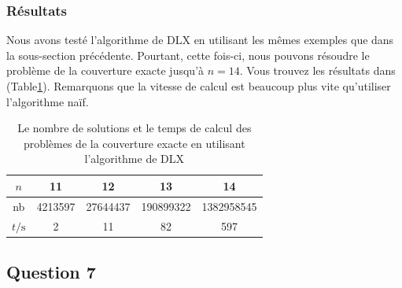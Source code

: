 \documentclass[a4paper,12pt]{article}
\begin{document}
\subsubsection{Résultats}
Nous avons testé l'algorithme de DLX en utilisant les mêmes exemples que dans la sous-section précédente. Pourtant, cette fois-ci, nous pouvons résoudre le problème de la couverture exacte jusqu'à $n=14$. Vous trouvez les résultats dans (Table\ref{tab:nbsolution_dlx}). Remarquons que la vitesse de calcul est beaucoup plus vite qu'utiliser l'algorithme naïf.
\begin{table}[h]
	\caption{Le nombre de solutions et le temps de calcul des problèmes de la couverture exacte en utilisant l'algorithme de DLX}
	\centering
	\label{tab:nbsolution_dlx}
	\begin{tabular}{c|cccc}
		\hline
		\hline
		$n$ &11 & 12 & 13 & 14\\
		\hline
		nb & 4213597 & 27644437 & 190899322 & 1382958545\\
		\hline
		$t/\mathrm{s}$ & 2 & 11 &  82 & 597\\
		\hline
	\end{tabular}
\end{table}

\subsection{Question 7}
\end{document}
